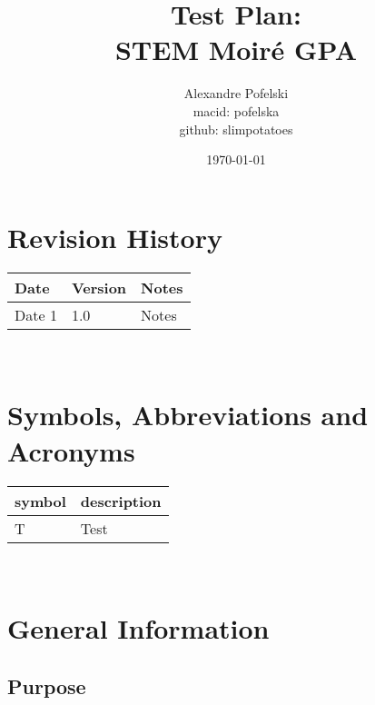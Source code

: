 \documentclass[12pt, titlepage]{article}
\begin{document}
\title{Test Plan:\\
		STEM Moir{\'e} GPA} 
\author{Alexandre Pofelski \\
		macid: pofelska \\
		github: slimpotatoes}
\date{\today}
	
\maketitle


\section{Revision History}

\begin{tabularx}{\textwidth}{p{3cm}p{2cm}X}
\toprule {\bf Date} & {\bf Version} & {\bf Notes}\\
\midrule
Date 1 & 1.0 & Notes\\
\bottomrule
\end{tabularx}

~\newpage

\section{Symbols, Abbreviations and Acronyms}
\label{symbols}

\renewcommand{\arraystretch}{1.2}
\begin{tabular}{l l} 
  \toprule		
  \textbf{symbol} & \textbf{description}\\
  \midrule 
  T & Test\\
  \bottomrule
\end{tabular}\\


\newpage

\tableofcontents

\listoftables

\listoffigures

\newpage



\section{General Information}

\subsection{Purpose}
\end{document}
